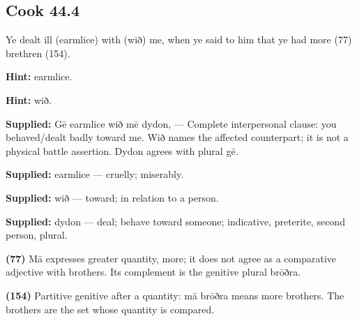 \par\begin{minipage}{\linewidth}\raggedright
\subsection*{Cook 44.4}

Ye dealt ill (earmlice) with (wið) me, when ye said to him that ye had more (77) brethren (154).

\textbf{Hint:} earmlice.

\textbf{Hint:} wið.

\end{minipage}\par\addvspace{4pt}

\textbf{Supplied:} Gē earmlice wið mē dydon, — Complete interpersonal clause: you behaved/\allowbreak{}dealt badly toward me. Wið names the affected counterpart; it is not a physical battle assertion. Dydon agrees with plural gē.

\textbf{Supplied:} earmlice — cruelly; miserably.

\textbf{Supplied:} wið — toward; in relation to a person.

\textbf{Supplied:} dydon — deal; behave toward someone; indicative, preterite, second person, plural.

\textbf{(77)} Mā expresses greater quantity, more; it does not agree as a comparative adjective with brothers. Its complement is the genitive plural brōðra.

\textbf{(154)} Partitive genitive after a quantity: mā brōðra means more brothers. The brothers are the set whose quantity is compared.

